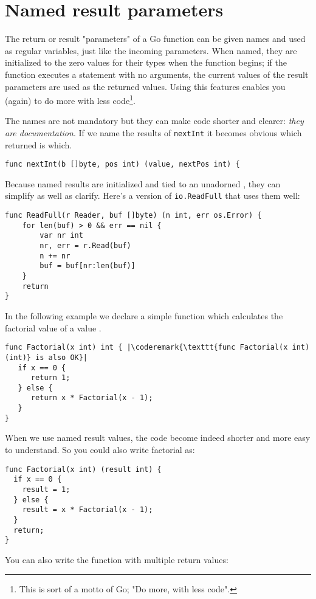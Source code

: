 \section{Named result parameters}
\label{sec:named result parameters}
The return or result "parameters" of a Go function can be given names and used
as regular variables, just like the incoming parameters. When named, they are
initialized to the zero values for their types when the function begins; if the
function executes a  statement with no arguments, the current values of
the result parameters are used as the returned values. Using this
features enables you (again) to do more with less code\footnote{This is
sort of a motto of Go; "Do more, with less code".}.

The names are not mandatory but they can make code shorter and clearer:
\emph{they are documentation}. 
If we name the results of \lstinline{nextInt} it becomes obvious which
returned  is which.

\begin{lstlisting}
func nextInt(b []byte, pos int) (value, nextPos int) {
\end{lstlisting}
Because named results are initialized and tied to an unadorned
,
they can simplify as well as clarify. Here's a version of
\lstinline{io.ReadFull} that uses them well:

\begin{lstlisting}
func ReadFull(r Reader, buf []byte) (n int, err os.Error) {
    for len(buf) > 0 && err == nil {
        var nr int
        nr, err = r.Read(buf)
        n += nr
        buf = buf[nr:len(buf)]
    }
    return
}
\end{lstlisting}

In the following example we declare a simple function which calculates
the factorial value of a value .

\begin{lstlisting}
func Factorial(x int) int { |\coderemark{\texttt{func Factorial(x int) (int)} is also OK}|
   if x == 0 {
      return 1;	
   } else {
      return x * Factorial(x - 1);
   }
}
\end{lstlisting}

When we use named result values, the code become indeed shorter and
more easy to understand.
So you could also write factorial as:
\begin{lstlisting}
func Factorial(x int) (result int) {
  if x == 0 {
    result = 1;	
  } else {
    result = x * Factorial(x - 1);
  }
  return;
}
\end{lstlisting}
You can also write the function with multiple return values:

